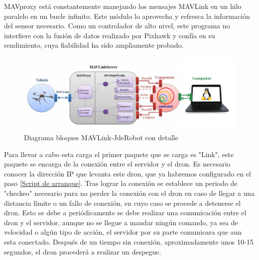 MAVproxy está constantemente manejando los mensajes MAVLink en un hilo paralelo en un bucle infinito. Este módulo lo aprovecha y refresca la información del sensor necesario. Como un controlador de alto nivel, este programa no interfiere con la fusión de datos realizado por Pixhawk y confía en su rendimiento, cuya fiabilidad ha sido ampliamente probado.

\begin{figure}[H]
  \centering
  \includegraphics[scale=0.35]{imagenes/cajaTrasparente.png}
  \caption{Diagrama bloques MAVLink-JdeRobot con detalle}
  \label{fig:mavLinkJdeRobotTrasparente}
\end{figure}


Para llevar a cabo esta carga el primer paquete que se carga es "Link", este paquete se encarga de la conexión entre el servidor y el dron. Es necesario conocer la dirección IP que levanta este dron, que ya habremos configurado en el paso \ref{Script de arranque}. Tras lograr la conexión se establece un periodo de "checkeo" necesario para no perder la conexión con el dron en caso de llegar a una distancia límite o un fallo de conexión, en cuyo caso se procede a detenerse el dron. Esto se debe a periódicamente se debe realizar una comunicación entre el dron y el servidor, aunque no se llegue a mandar ningún comando, ya sea de velocidad o algún tipo de acción, el servidor por su parte comunicara que aun esta conectado. Después de un tiempo sin conexión, aproximadamente unos 10-15 segundos, el dron procederá a realizar un despegue. 




